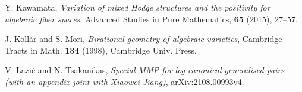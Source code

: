 \documentclass[11pt]{amsart}
\numberwithin{equation}{section}
\theoremstyle{definition}
\theoremstyle{definition}
\theoremstyle{definition}
\begin{document}
\begin{thebibliography}{99}
 Y. Kawamata, \textit{Variation of mixed Hodge structures and the positivity for algebraic fiber spaces}, Advanced Studies in Pure Mathematics, \textbf{65} (2015), 27--57.





 J. Koll\'{a}r and S. Mori, \textit{Birational geometry of algebraic varieties}, Cambridge Tracts in Math. \textbf{134} (1998), Cambridge Univ. Press.




 V. Lazi\'c and N. Tsakanikas, \textit{Special MMP for log canonical generalised pairs (with an appendix joint with Xiaowei Jiang)}, arXiv:2108.00993v4.






\end{thebibliography}
\end{document}
